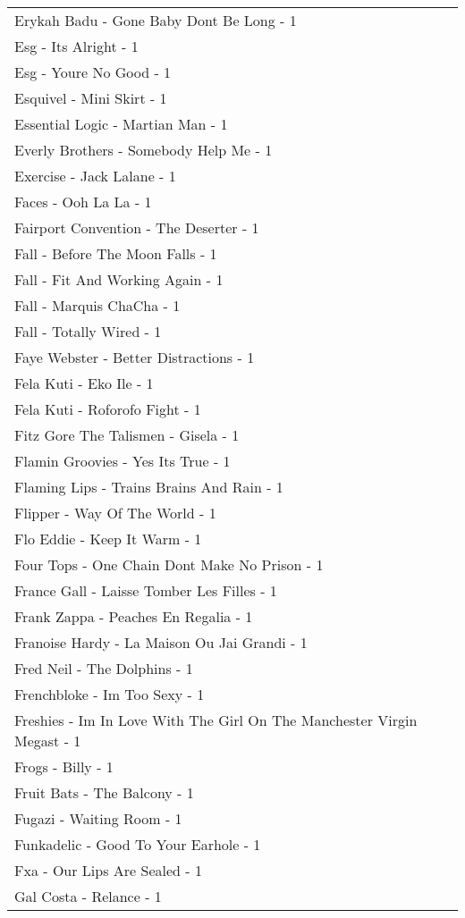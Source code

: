 \documentclass[
]{article}
\begin{document}
\begin{longtable}{l}
Erykah Badu - Gone Baby Dont Be Long - 1 \\ 
Esg - Its Alright - 1 \\ 
Esg - Youre No Good - 1 \\ 
Esquivel - Mini Skirt - 1 \\ 
Essential Logic - Martian Man - 1 \\ 
Everly Brothers - Somebody Help Me - 1 \\ 
Exercise - Jack Lalane - 1 \\ 
Faces - Ooh La La - 1 \\ 
Fairport Convention - The Deserter - 1 \\ 
Fall - Before The Moon Falls - 1 \\ 
Fall - Fit And Working Again - 1 \\ 
Fall - Marquis ChaCha - 1 \\ 
Fall - Totally Wired - 1 \\ 
Faye Webster - Better Distractions - 1 \\ 
Fela Kuti - Eko Ile - 1 \\ 
Fela Kuti - Roforofo Fight - 1 \\ 
Fitz Gore The Talismen - Gisela - 1 \\ 
Flamin Groovies - Yes Its True - 1 \\ 
Flaming Lips - Trains Brains And Rain - 1 \\ 
Flipper - Way Of The World - 1 \\ 
Flo Eddie - Keep It Warm - 1 \\ 
Four Tops - One Chain Dont Make No Prison - 1 \\ 
France Gall - Laisse Tomber Les Filles - 1 \\ 
Frank Zappa - Peaches En Regalia - 1 \\ 
Franoise Hardy - La Maison Ou Jai Grandi - 1 \\ 
Fred Neil - The Dolphins - 1 \\ 
Frenchbloke - Im Too Sexy - 1 \\ 
Freshies - Im In Love With The Girl On The Manchester Virgin Megast - 1 \\ 
Frogs - Billy - 1 \\ 
Fruit Bats - The Balcony - 1 \\ 
Fugazi - Waiting Room - 1 \\ 
Funkadelic - Good To Your Earhole - 1 \\ 
Fxa - Our Lips Are Sealed - 1 \\ 
Gal Costa - Relance - 1 \\ 

\end{longtable}
\end{document}
